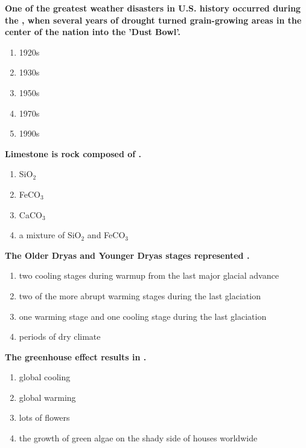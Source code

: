 \item {
\setlength{\itemsep}{0cm}
\setlength{\parskip}{.2cm}
\begin{samepage}
\textbf{
One of the greatest weather disasters in U.S. history occurred during the \makebox[1cm]{\Rivpt\hrulefill\Rivpt}, when several years of drought turned grain-growing areas in the center of the nation into the 'Dust Bowl'. 
}
\begin{enumerate}
\item {  1920s }
\item {  1930s }
\item {  1950s }
\item {  1970s }
\item {  1990s }
\end{enumerate}
\end{samepage}
}
\item {
\setlength{\itemsep}{0cm}
\setlength{\parskip}{.2cm}
\begin{samepage}
\textbf{
Limestone is rock composed of \makebox[1cm]{\Rivpt\hrulefill\Rivpt}. 
}
\begin{enumerate}
\item {  SiO\ensuremath{_2} }
\item {  FeCO\ensuremath{_3} }
\item {  CaCO\ensuremath{_3} }
\item {  a mixture of SiO\ensuremath{_2} and FeCO\ensuremath{_3} }
\end{enumerate}
\end{samepage}
}
\item {
\setlength{\itemsep}{0cm}
\setlength{\parskip}{.2cm}
\begin{samepage}
\textbf{
The Older Dryas and Younger Dryas stages represented \makebox[1cm]{\Rivpt\hrulefill\Rivpt}.
}
\begin{enumerate}
\item {  two cooling stages during warmup from the last major glacial advance }
\item {  two of the more abrupt warming stages during the last glaciation }
\item {  one warming stage and one cooling stage during the last glaciation }
\item {  periods of dry climate  }
\end{enumerate}
\end{samepage}
}
\item {
\setlength{\itemsep}{0cm}
\setlength{\parskip}{.2cm}
\begin{samepage}
\textbf{
The greenhouse effect results in \makebox[1cm]{\Rivpt\hrulefill\Rivpt}.
}
\begin{enumerate}
\item {  global cooling }
\item {  global warming }
\item {  lots of flowers }
\item {  the growth of green algae on the shady side of houses worldwide }
\end{enumerate}
\end{samepage}
}
